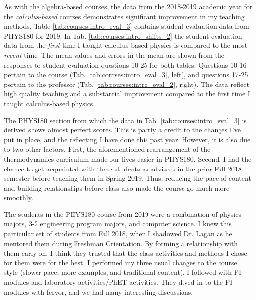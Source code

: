 \documentclass[../../main.tex]{subfiles}
\begin{document}
As with the algebra-based courses, the data from the 2018-2019 academic year for the \textit{calculus-based} courses demonstrates significant improvement in my teaching methods.  Table \ref{tab:courses:intro_eval_3} contains student evaluation data from PHYS180 for 2019.  In Tab. \ref{tab:courses:intro_shifts_2} the student evaluation data from the \textit{first} time I taught calculus-based physics is compared to the most \textit{recent} time.  The mean values and errors in the mean are shown from the responses to student evaluation questions 10-25 for both tables.  Questions 10-16 pertain to the course (Tab. \ref{tab:courses:intro_eval_3}, left), and questions 17-25 pertain to the professor (Tab. \ref{tab:courses:intro_eval_2}, right).  The data reflect high quality teaching and a substantial improvement compared to the first time I taught calculus-based physics. \\ \hspace{0.1cm}

The PHYS180 section from which the data in Tab. \ref{tab:courses:intro_eval_3} is derived shows almost perfect scores.  This is partly a credit to the changes I've put in place, and the reflecting I have done this past year.  However, it is also due to two other factors.  First, the aforementioned rearrangement of the thermodynamics curriculum made our lives easier in PHYS180.  Second, I had the chance to get acquainted with these students as advisees in the prior Fall 2018 semester before teaching them in Spring 2019.  Thus, reducing the pace of content and building relationships before class also made the course go much more smoothly. \\ \hspace{0.1cm}

The students in the PHYS180 course from 2019 were a combination of physics majors, 3-2 engineering program majors, and computer science.  I knew this particular set of students from Fall 2018, when I shadowed Dr. Lagan as he mentored them during Freshman Orientation.  By forming a relationship with them early on, I think they trusted that the class activities and methods I chose for them were for the best.  I performed my three usual changes to the course style (slower pace, more examples, and traditional content).  I followed with PI modules and laboratory activities/PhET activities.  They dived in to the PI modules with fervor, and we had many interesting discussions. \\ \hspace{0.1cm}
\end{document}
